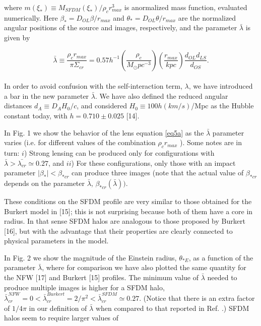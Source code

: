 \documentclass[10pt,a4paper]{article}
\begin{document}
\begin{multicols}{2}
where $m(\xi_{\ast}) \equiv M_{SFDM}(\xi_{\ast})/\rho_cr_{max}^3$ is anormalized mass function, evaluated numerically. Here $ \beta_{\ast} = D_{OL}\beta/r_{max}$ and $\theta_{\ast} = D_{OL}\theta/r_{max}$ are the normalized angular positions of the source and images, respectively, and the parameter $\bar{\lambda} $ is given by

\begin{equation} \tag{5b}\label{eq5b}
\bar{\lambda} \equiv \frac{\rho_c r_{max}}{\pi \Sigma_{cr}} = 0.57h^{-1}(\frac{\rho_{c}}{M_{\odot}pc^{-3}})(\frac{r_{max}}{kpc})\frac{d_{OL} d_{LS}}{d_{OS}}.
\end{equation}
\\
In order to avoid confusion with the self-interaction term, $\lambda$, we have introduced a bar in the new parameter $\bar{\lambda}$. We have also defined the reduced angular distances $d_{A} \equiv D_{A}H_{0}/c$, and considered $H_{0} \equiv 100h(km/s)$/Mpc as the Hubble constant today, with $h = 0.710 \pm 0.025$ [14].\

In Fig. 1 we show the behavior of the lens equation \eqref{eq5a} as the $\bar{\lambda}$ parameter varies (i.e. for different values of the combination $\rho_{c}r_{max}$ ). Some notes are in turn: $i$) Strong lensing can be produced only for configurations with $\bar{\lambda} > \bar{\lambda_{cr}} \simeq 0.27$, and $ii$) For these configurations, only those with an impact parameter $|\beta_{\ast}| < \beta_{\ast cr}$ can produce three images (note that the actual value of $\beta_{\ast cr}$ depends on the parameter $\bar{\lambda}$, $\beta_{\ast cr}(\bar{\lambda}))$.\

These conditions on the SFDM profile are very similar to those obtained for the Burkert model in [15]; this is not surprising because both of them have a core in radius. In that sense SFDM halos are analogous to those proposed by Burkert [16], but with the advantage that their properties are clearly connected to physical parameters in the model.\

In Fig. 2 we show the magnitude of the Einstein radius, $\theta_{\ast E}$, as a function of the parameter $\bar{\lambda}$, where for comparison we have also plotted the same quantity for the NFW [17] and Burkert [15] profiles. The minimum value of $\bar{\lambda}$ needed to produce multiple images is higher for a SFDM halo, $\bar{\lambda}_{cr}^{NFW} = 0 < \bar{\lambda}_{cr}^{Burkert} = 2/\pi^2 < \bar{\lambda}_{cr}^{SFDM} \simeq 0.27$. (Notice that there is an extra factor of $1/4\pi$ in our definition of $\bar{\lambda}$ when compared to that reported in
Ref. \cite{Park_2003}.) SFDM halos seem to require larger values of\\


\end{multicols}
\end{document}
